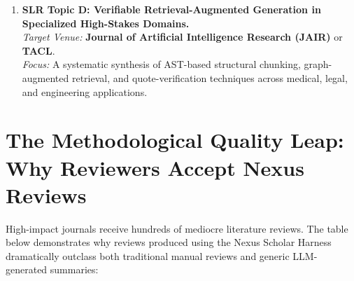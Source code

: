 \documentclass[10pt,a4paper]{article}
\begin{document}
\begin{enumerate}[leftmargin=1.4em, itemsep=2.5pt, topsep=2pt]
    \item \textbf{SLR Topic D: Verifiable Retrieval-Augmented Generation in Specialized High-Stakes Domains.}\\
    \textit{Target Venue:} \textbf{Journal of Artificial Intelligence Research (JAIR)} or \textbf{TACL}.\\
    \textit{Focus:} A systematic synthesis of AST-based structural chunking, graph-augmented retrieval, and quote-verification techniques across medical, legal, and engineering applications.
\end{enumerate}

\newpage
\section{The Methodological Quality Leap: Why Reviewers Accept Nexus Reviews}

High-impact journals receive hundreds of mediocre literature reviews. The table below demonstrates why reviews produced using the Nexus Scholar Harness dramatically outclass both traditional manual reviews and generic LLM-generated summaries:
\end{document}

